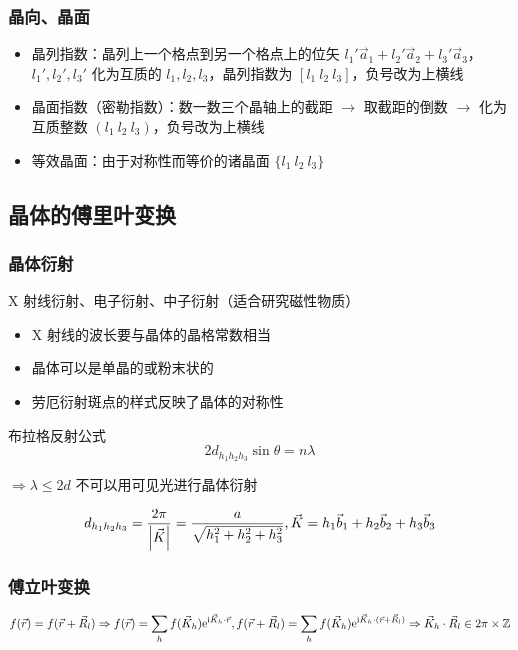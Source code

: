 \subsubsection{晶向、晶面}

\begin{itemize}
    \item 晶列指数：晶列上一个格点到另一个格点上的位矢 $l_1' \vec{a}_1 + l_2' \vec{a}_2 + l_3' \vec{a}_3$，$l_1', l_2', l_3'$ 化为互质的 $l_1, l_2, l_3$，晶列指数为 $ [l_1 \ l_2 \ l_3] $，负号改为上横线
    \item 晶面指数（密勒指数）：数一数三个晶轴上的截距 $\to$ 取截距的倒数 $\to$ 化为互质整数 $ (l_1 \ l_2 \ l_3) $，负号改为上横线
    \item 等效晶面：由于对称性而等价的诸晶面 $\{l_1 \ l_2 \ l_3\}$
\end{itemize}

\subsection{晶体的傅里叶变换}

\subsubsection{晶体衍射}

X 射线衍射、电子衍射、中子衍射（适合研究磁性物质）

\begin{itemize}
    \item X 射线的波长要与晶体的晶格常数相当
    \item 晶体可以是单晶的或粉末状的
    \item 劳厄衍射斑点的样式反映了晶体的对称性
\end{itemize}

布拉格反射公式
\[ 2 d_{h_1 h_2 h_3} \sin \theta = n \lambda \]

$\Rightarrow \lambda \leq 2 d$ 不可以用可见光进行晶体衍射

\[ d_{h_1 h_2 h_3} = \frac{2 \pi}{\abs{\vec{K}}} = \frac{a}{\sqrt{h_1^2 + h_2^2 + h_3^2}}, \vec{K} = h_1 \vec{b}_1 + h_2 \vec{b}_2 + h_3 \vec{b}_3 \]

\subsubsection{傅立叶变换}

\[ f(\vec{r}) = f(\vec{r} + \vec{R}_{l}) \Rightarrow f(\vec{r}) = \sum_h f(\vec{K}_{h}) \mathrm{e}^{\mathrm{i} \vec{K}_{h} \cdot \vec{r}}, f(\vec{r} + \vec{R}_{l}) = \sum_h f(\vec{K}_{h}) \mathrm{e}^{\mathrm{i} \vec{K}_{h} \cdot (\vec{r} + \vec{R}_{l})} \Rightarrow \vec{K}_{h} \cdot \vec{R}_{l} \in 2 \pi \times \mathbb{Z} \]

